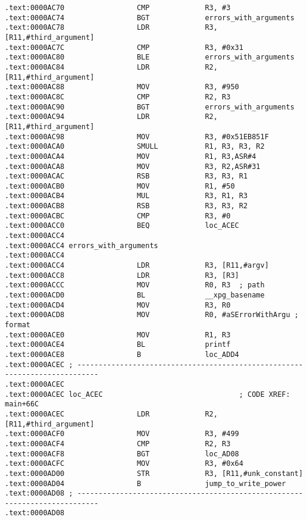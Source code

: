 \begin{lstlisting}
.text:0000AC70                 CMP             R3, #3
.text:0000AC74                 BGT             errors_with_arguments
.text:0000AC78                 LDR             R3, [R11,#third_argument]
.text:0000AC7C                 CMP             R3, #0x31
.text:0000AC80                 BLE             errors_with_arguments
.text:0000AC84                 LDR             R2, [R11,#third_argument]
.text:0000AC88                 MOV             R3, #950
.text:0000AC8C                 CMP             R2, R3
.text:0000AC90                 BGT             errors_with_arguments
.text:0000AC94                 LDR             R2, [R11,#third_argument]
.text:0000AC98                 MOV             R3, #0x51EB851F
.text:0000ACA0                 SMULL           R1, R3, R3, R2
.text:0000ACA4                 MOV             R1, R3,ASR#4
.text:0000ACA8                 MOV             R3, R2,ASR#31
.text:0000ACAC                 RSB             R3, R3, R1
.text:0000ACB0                 MOV             R1, #50
.text:0000ACB4                 MUL             R3, R1, R3
.text:0000ACB8                 RSB             R3, R3, R2
.text:0000ACBC                 CMP             R3, #0
.text:0000ACC0                 BEQ             loc_ACEC
.text:0000ACC4
.text:0000ACC4 errors_with_arguments
.text:0000ACC4                                         
.text:0000ACC4                 LDR             R3, [R11,#argv]
.text:0000ACC8                 LDR             R3, [R3]
.text:0000ACCC                 MOV             R0, R3  ; path
.text:0000ACD0                 BL              __xpg_basename
.text:0000ACD4                 MOV             R3, R0
.text:0000ACD8                 MOV             R0, #aSErrorWithArgu ; format
.text:0000ACE0                 MOV             R1, R3
.text:0000ACE4                 BL              printf
.text:0000ACE8                 B               loc_ADD4
.text:0000ACEC ; ---------------------------------------------------------------------------
.text:0000ACEC
.text:0000ACEC loc_ACEC                                ; CODE XREF: main+66C
.text:0000ACEC                 LDR             R2, [R11,#third_argument]
.text:0000ACF0                 MOV             R3, #499
.text:0000ACF4                 CMP             R2, R3
.text:0000ACF8                 BGT             loc_AD08
.text:0000ACFC                 MOV             R3, #0x64
.text:0000AD00                 STR             R3, [R11,#unk_constant]
.text:0000AD04                 B               jump_to_write_power
.text:0000AD08 ; ---------------------------------------------------------------------------
.text:0000AD08

\end{lstlisting}
